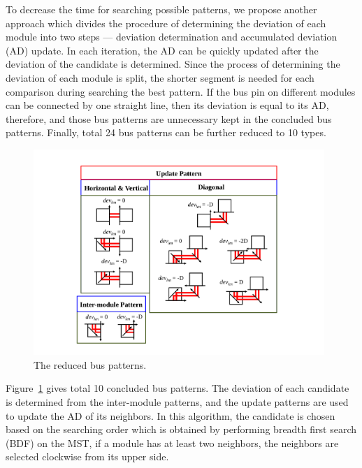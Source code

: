 To decrease the time for searching possible patterns, we propose another approach
which divides the procedure of determining the deviation of each
module into two steps --- deviation determination and accumulated deviation (AD) update.
In each iteration, the AD can be quickly updated after the deviation of the candidate is determined.
Since the process of determining the deviation of each
module is split, the shorter segment is needed for each comparison during searching the best pattern.
If the bus pin on different modules can be connected by one straight line, then its deviation is equal to its AD,
therefore, and those bus patterns are unnecessary kept in the concluded bus patterns.
Finally, total 24 bus patterns can be further reduced to 10 types.
\begin{figure}[htb]
  \centering
    \includegraphics[width=11cm]{Fig/deviation_reduced_pattern.pdf}
     \caption{
      The reduced bus patterns.
   }
  \label{fig::deviation_reduced_pattern}
\end{figure}

Figure~\ref{fig::deviation_reduced_pattern} gives total 10 concluded
bus patterns. The deviation of each candidate is determined from the inter-module patterns, and the update patterns
are used to update the AD of its neighbors.
In this algorithm, the candidate is chosen based on the searching order which is obtained by performing
breadth first search (BDF) on the MST, if a module has at least two neighbors, the neighbors are selected clockwise from its upper side.

